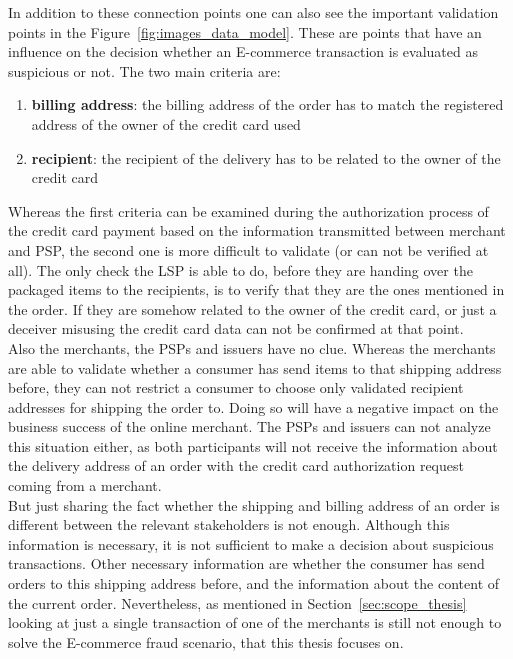In addition to these connection points one can also see the important validation points in the Figure~\ref{fig:images_data_model}. These are points that have an influence on the decision whether an \gls{E-commerce} transaction is evaluated as suspicious or not. The two main criteria are: \@

\begin{enumerate}
  \item \textbf{billing address}: the billing address of the order has to match the registered address of the owner of the credit card used
  \item \textbf{recipient}: the recipient of the delivery has to be related to the owner of the credit card
\end{enumerate}


Whereas the first criteria can be examined during the authorization process of the credit card payment based on the information transmitted between merchant and \gls{PSP}, the second one is more difficult to validate (or can not be verified at all). The only check the \gls{LSP} is able to do, before they are handing over the packaged items to the recipients, is to verify that they are the ones mentioned in the order. If they are somehow related to the owner of the credit card, or just a deceiver misusing the credit card data can not be confirmed at that point. \\

Also the merchants, the \gls{PSP}s and issuers have no clue. Whereas the merchants are able to validate whether a consumer has send items to that shipping address before, they can not restrict a consumer to choose only validated recipient addresses for shipping the order to. Doing so will have a negative impact on the business success of the online merchant. The \gls{PSP}s and issuers can not analyze this situation either, as both participants will not receive the information about the delivery address of an order with the credit card authorization request coming from a merchant. \\

But just sharing the fact whether the shipping and billing address of an order is different between the relevant stakeholders is not enough. Although this information is necessary, it is not sufficient to make a decision about suspicious transactions. Other necessary information are whether the consumer has send orders to this shipping address before, and the information about the content of the current order. Nevertheless, as mentioned in Section~\ref{sec:scope_thesis} looking at just a single transaction of one of the merchants is still not enough to solve the \gls{E-commerce} fraud scenario, that this thesis focuses on. \\

